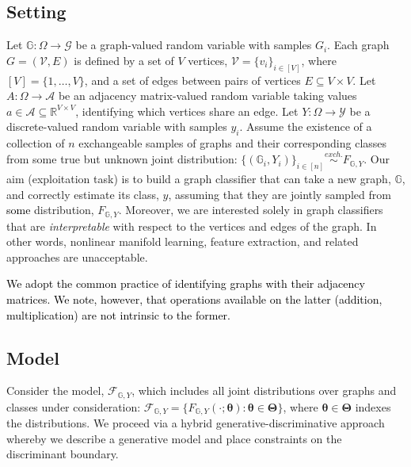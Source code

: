 \documentclass[10pt,journal,cspaper,compsoc]{IEEEtran}
\providecommand{\tk}[1]{\textcolor{black}{#1}}
\providecommand{\ve}[1]{\boldsymbol{#1}}
\newcommand{\GG}{\mathbb{G}}
\newcommand{\bth}{\ve{\theta}}
\newcommand{\bTh}{\ve{\Theta}}
\providecommand{\mc}[1]{\mathcal{#1}}
\newcommand{\Real}{\mathbb{R}}
\newcommand{\comment}[1]{}
\begin{document}



\subsection{Setting}

Let $\GG: \Omega \to  \mc{G}$ be a graph-valued random variable with samples $G_i$.  Each graph $G=(\mc{V},E)$ is defined by a set of $V$ vertices, $\mc{V}=\{v_i\}_{i \in [V]}$, where $[V]=\{1,\ldots, V\}$, and a set of  edges between pairs of vertices $E \subseteq V \times V$. Let $A: \Omega \to  \mc{A}$ be an adjacency matrix-valued random variable taking values $a \in \mc{A} \subseteq \Real^{V \times V}$, identifying which vertices share an edge. Let $Y:\Omega \to  \mc{Y}$ be a discrete-valued random variable with samples $y_i$.  Assume the existence of a collection of $n$ exchangeable samples of graphs and their corresponding classes from some true but unknown joint distribution: $\{(\GG_i,Y_i)\}_{i \in [n]} \overset{exch.}{\sim} F_{\GG,Y}$. Our aim (exploitation task) is to build a graph classifier that can take a new graph, $\GG$, and correctly estimate its class, $y$, assuming that they are jointly sampled from \comment{the same} \tk{some} distribution, $F_{\GG,Y}$.  Moreover, we are interested solely in graph classifiers that are \emph{interpretable} with respect to the vertices and edges of the graph. In other words, nonlinear manifold learning, feature extraction, and related approaches are unacceptable.  

\tk{We adopt the common practice of identifying graphs with their adjacency matrices.  We note, however, that operations available on the latter (addition, multiplication) are not intrinsic to the former.}

\subsection{Model} %
\label{sub:model}

\comment{A model defines the set of distributions under consideration.  In the graph classification domain, we} Consider the model, $\mc{F}_{\GG,Y}$, which includes all joint distributions over graphs and classes under consideration: $\mc{F}_{\GG,Y}=\{F_{\GG, Y}(\cdot; \bth) : \bth \in \bTh\}$, where $\bth \in \bTh$ indexes the distributions.  \comment{Two standard approaches for tackling a classification problem are (i) the \emph{generative} approach and (ii) the \emph{discriminative} approach.  In a generative strategy, one decomposes the joint distribution into a product of a likelihood term and a prior term:  $F_{\GG,Y}=F_{\GG | Y}F_Y$.  In a discriminative strategy, one decomposes the joint distribution into a posterior term and a marginal term: $F_{\GG,Y}=F_{Y | \GG}F_{\GG}$.}  We proceed via a hybrid generative-discriminative approach \tk{\cite{Lasserre2006}} whereby we describe a generative model and place constraints on the discriminant boundary.
\end{document}
